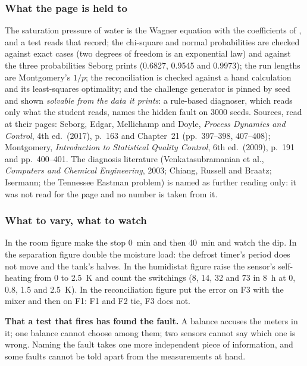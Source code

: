 \documentclass[11pt,a4paper]{article}
\begin{document}
\subsubsection*{What the page is held to}

The saturation pressure of water is the Wagner equation with the coefficients
of , and a test reads that record;
the chi-square and normal probabilities are checked against exact cases
(two degrees of freedom is an exponential law) and against the three
probabilities Seborg prints (0.6827, 0.9545 and 0.9973); the run lengths are
Montgomery's $1/p$; the reconciliation is checked against a hand calculation
and its least-squares optimality; and the challenge generator is pinned by seed
and shown \emph{solvable from the data it prints}: a rule-based diagnoser, which
reads only what the student reads, names the hidden fault on 3000 seeds.
Sources, read at their pages: Seborg, Edgar, Mellichamp and Doyle,
\emph{Process Dynamics and Control}, 4th ed.\ (2017), p.~163 and Chapter~21
(pp.~397--398, 407--408); Montgomery, \emph{Introduction to Statistical Quality
Control}, 6th ed.\ (2009), p.~191 and pp.~400--401.  The diagnosis literature
(Venkatasubramanian et al., \emph{Computers and Chemical Engineering}, 2003;
Chiang, Russell and Braatz; Isermann; the Tennessee Eastman problem) is named
as further reading only: it was not read for the page and no number is taken
from it.

\subsubsection*{What to vary, what to watch}

\begin{tryit}
In the room figure make the stop 0~min and then 40~min and watch the dip.  In
the separation figure double the moisture load: the defrost timer's period does
not move and the tank's halves.  In the humidistat figure raise the sensor's
self-heating from 0 to 2.5~K and count the switchings (8, 14, 32 and 73 in
8~h at 0, 0.8, 1.5 and 2.5~K).  In the reconciliation figure put the error on
F3 with the mixer and then on F1: F1 and F2 tie, F3 does not.
\end{tryit}

\begin{pitfall}
\textbf{That a test that fires has found the fault.}  A balance accuses the
meters in it; one balance cannot choose among them; two sensors cannot say
which one is wrong.  Naming the fault takes one more independent piece of
information, and some faults cannot be told apart from the measurements at
hand.
\end{pitfall}
\end{document}
